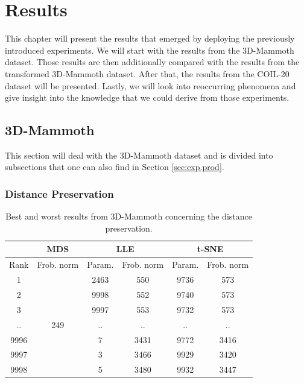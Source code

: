 \chapter{Results}

This chapter will present the results that emerged by deploying the previously introduced experiments. We will start with the results from the 3D-Mammoth dataset. Those results are then additionally compared with the results from the transformed 3D-Mammoth dataset. After that, the results from the COIL-20 dataset will be presented. Lastly, we will look into reoccurring phenomena and give insight into the knowledge that we could derive from those experiments.

\section{3D-Mammoth}

This section will deal with the 3D-Mammoth dataset and is divided into subsections that one can also find in Section \ref{sec:exp.prod}.

\subsection{Distance Preservation} \label{subsec:mammoth_dist}

\begin{table}[]
\centering
\begin{tabular}{|c|cl|cc|cc|}
\hline
 & \multicolumn{2}{c|}{{\color[HTML]{1b9e77} \textbf{MDS}}} & \multicolumn{2}{c|}{{\color[HTML]{d95f02} \textbf{LLE}}} & \multicolumn{2}{c|}{{\color[HTML]{7570B3} \textbf{t-SNE}}} \\ \hline
Rank & \multicolumn{2}{c|}{Frob. norm} & \multicolumn{1}{c|}{Param.} & Frob. norm & \multicolumn{1}{c|}{Param.} & Frob. norm \\ \hline
1 & \multicolumn{2}{c|}{\multirow{7}{*}{249}} & \multicolumn{1}{c|}{2463} & 550 & \multicolumn{1}{c|}{9736} & 573 \\ \cline{1-1} \cline{4-7} 
2 & \multicolumn{2}{c|}{} & \multicolumn{1}{c|}{9998} & 552 & \multicolumn{1}{c|}{9740} & 573 \\ \cline{1-1} \cline{4-7} 
3 & \multicolumn{2}{c|}{} & \multicolumn{1}{c|}{9997} & 553 & \multicolumn{1}{c|}{9732} & 573 \\ \cline{1-1} \cline{4-7} 
.. & \multicolumn{2}{c|}{} & \multicolumn{1}{c|}{..} & .. & \multicolumn{1}{c|}{..} & .. \\ \cline{1-1} \cline{4-7} 
9996 & \multicolumn{2}{c|}{} & \multicolumn{1}{c|}{7} & 3431 & \multicolumn{1}{c|}{9772} & 3416 \\ \cline{1-1} \cline{4-7} 
9997 & \multicolumn{2}{c|}{} & \multicolumn{1}{c|}{3} & 3466 & \multicolumn{1}{c|}{9929} & 3420 \\ \cline{1-1} \cline{4-7} 
9998 & \multicolumn{2}{c|}{} & \multicolumn{1}{c|}{5} & 3480 & \multicolumn{1}{c|}{9932} & 3447 \\ \hline
\end{tabular}
\caption[3D-Mammoth Distance Preservation]{Best and worst results from 3D-Mammoth concerning the distance preservation.}
\label{tab:best_worst_dist_mammoth}
\end{table}

